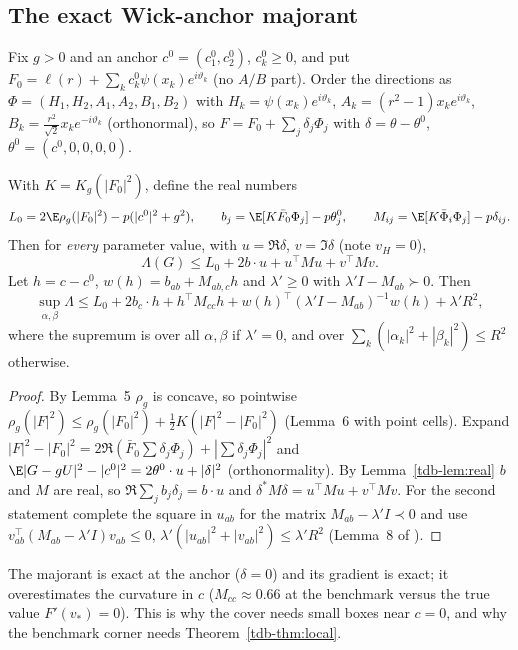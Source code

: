 \subsection{The exact Wick-anchor majorant}

Fix $g>0$ and an anchor $c^0=(c_1^0,c_2^0)$, $c_k^0\ge0$, and put $F_0=\ell(r)+\sum_kc^0_k\psi(x_k)e^{i\vartheta_k}$ (no $A/B$ part).
Order the directions as $\Phi=(H_1,H_2,A_1,A_2,B_1,B_2)$ with $H_k=\psi(x_k)e^{i\vartheta_k}$, $A_k=(r^2-1)x_ke^{i\vartheta_k}$,
$B_k=\tfrac{r^2}{\sqrt2}x_ke^{-i\vartheta_k}$ (orthonormal), so $F=F_0+\sum_j\delta_j\Phi_j$ with $\delta=\theta-\theta^0$, $\theta^0=(c^0,0,0,0,0)$.

\begin{lemma}\label{tdb-lem:maj}
With $K=K_g(|F_0|^2)$, define the real numbers
\[
L_0=2\E\rho_g(|F_0|^2)-p(|c^0|^2+g^2),\qquad b_j=\E[K\bar F_0\Phi_j]-p\theta^0_j,\qquad M_{ij}=\E[K\bar\Phi_i\Phi_j]-p\delta_{ij}.
\]
Then for \emph{every} parameter value, with $u=\Re\delta$, $v=\Im\delta$ (note $v_H=0$),
\[
\Lambda(G)\le L_0+2b\cdot u+u^{\!\top}Mu+v^{\!\top}Mv .
\]
Let $h=c-c^0$, $w(h)=b_{ab}+M_{ab,c}h$ and $\lambda'\ge0$ with $\lambda' I-M_{ab}\succ0$. Then
\[
\sup_{\alpha,\beta}\Lambda\le L_0+2b_c\cdot h+h^{\!\top}M_{cc}h+w(h)^{\!\top}(\lambda'I-M_{ab})^{-1}w(h)+\lambda'R^2,
\]
where the supremum is over all $\alpha,\beta$ if $\lambda'=0$, and over $\sum_k(|\alpha_k|^2+|\beta_k|^2)\le R^2$ otherwise.
\end{lemma}
\begin{proof}
By Lemma~5 $\rho_g$ is concave, so pointwise $\rho_g(|F|^2)\le\rho_g(|F_0|^2)+\tfrac12K(|F|^2-|F_0|^2)$ (Lemma~6 with point cells).
Expand $|F|^2-|F_0|^2=2\Re(\bar F_0\sum\delta_j\Phi_j)+|\sum\delta_j\Phi_j|^2$ and $\E|G-gU|^2-|c^0|^2=2\theta^0\cdot u+|\delta|^2$ (orthonormality).
By Lemma~\ref{tdb-lem:real} $b$ and $M$ are real, so $\Re\sum_j b_j\delta_j=b\cdot u$ and $\delta^*M\delta=u^\top Mu+v^\top Mv$.
For the second statement complete the square in $u_{ab}$ for the matrix $M_{ab}-\lambda' I\prec0$ and use $v_{ab}^\top(M_{ab}-\lambda'I)v_{ab}\le0$,
$\lambda'(|u_{ab}|^2+|v_{ab}|^2)\le\lambda'R^2$ (Lemma~8 of \Sd).
\end{proof}
The majorant is exact at the anchor ($\delta=0$) and its gradient is exact; it overestimates the curvature in $c$ ($M_{cc}\approx0.66$ at the
benchmark versus the true value $F'(v_*)=0$). This is why the cover needs small boxes near $c=0$, and why the benchmark corner needs
Theorem~\ref{tdb-thm:local}.

